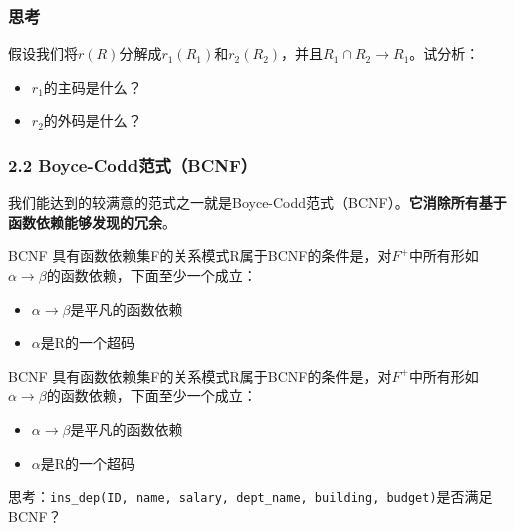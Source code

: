 \documentclass[aspectratio=169, 14pt]{beamer}
\begin{document}
\begin{frame}
    \frametitle{思考}
假设我们将$r(R)$分解成$r_1(R_1)$和$r_2(R_2)$，并且$R_1 \cap R_2 \rightarrow R_1$。试分析：

\begin{itemize}
    \item $r_1$的主码是什么？
    \item $r_2$的外码是什么？
\end{itemize}
    

\end{frame}

\begin{frame}
    \frametitle{2.2 Boyce-Codd范式（BCNF）}
我们能达到的较满意的范式之一就是\alert{Boyce-Codd范式}（BCNF）。\textbf{它消除所有基于函数依赖能够发现的冗余}。


\begin{exampleblock}{BCNF}
具有函数依赖集F的关系模式R属于BCNF的条件是，对$F^+$中所有形如$\alpha \rightarrow \beta$的函数依赖，下面至少一个成立：
\begin{itemize}
    \item $\alpha \rightarrow \beta$是平凡的函数依赖
    \item $\alpha$是R的一个超码
\end{itemize}
    
\end{exampleblock}

\end{frame}

\begin{frame}

    \begin{exampleblock}{BCNF}
        具有函数依赖集F的关系模式R属于BCNF的条件是，对$F^+$中所有形如$\alpha \rightarrow \beta$的函数依赖，下面至少一个成立：
        \begin{itemize}
            \item $\alpha \rightarrow \beta$是平凡的函数依赖
            \item $\alpha$是R的一个超码
        \end{itemize}
            
        \end{exampleblock}
        
          思考：\texttt{ins\_dep(ID, name, salary, dept\_name, building, budget)}是否满足BCNF？

\end{frame}
\end{document}
